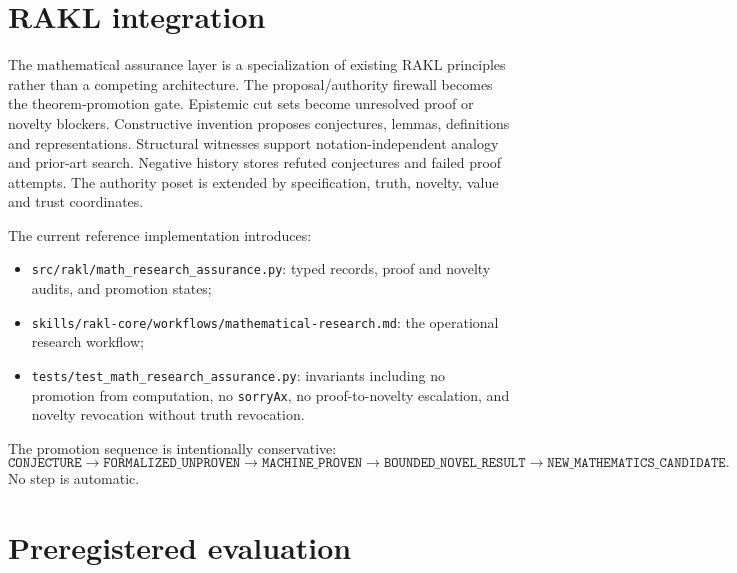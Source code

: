 \documentclass[11pt]{article}
\newcommand{\RAKL}{\textsc{RAKL}}
\begin{document}
\section{RAKL integration}

The mathematical assurance layer is a specialization of existing \RAKL{} principles rather than a competing architecture. The proposal/authority firewall becomes the theorem-promotion gate. Epistemic cut sets become unresolved proof or novelty blockers. Constructive invention proposes conjectures, lemmas, definitions and representations. Structural witnesses support notation-independent analogy and prior-art search. Negative history stores refuted conjectures and failed proof attempts. The authority poset is extended by specification, truth, novelty, value and trust coordinates.

The current reference implementation introduces:
\begin{itemize}[leftmargin=*]
\item \texttt{src/rakl/math\_research\_assurance.py}: typed records, proof and novelty audits, and promotion states;
\item \texttt{skills/rakl-core/workflows/mathematical-research.md}: the operational research workflow;
\item \texttt{tests/test\_math\_research\_assurance.py}: invariants including no promotion from computation, no \texttt{sorryAx}, no proof-to-novelty escalation, and novelty revocation without truth revocation.
\end{itemize}

The promotion sequence is intentionally conservative:
\[
\texttt{CONJECTURE}
\rightarrow
\texttt{FORMALIZED\_UNPROVEN}
\rightarrow
\texttt{MACHINE\_PROVEN}
\rightarrow
\texttt{BOUNDED\_NOVEL\_RESULT}
\rightarrow
\texttt{NEW\_MATHEMATICS\_CANDIDATE}.
\]
No step is automatic.

\section{Preregistered evaluation}
\end{document}
